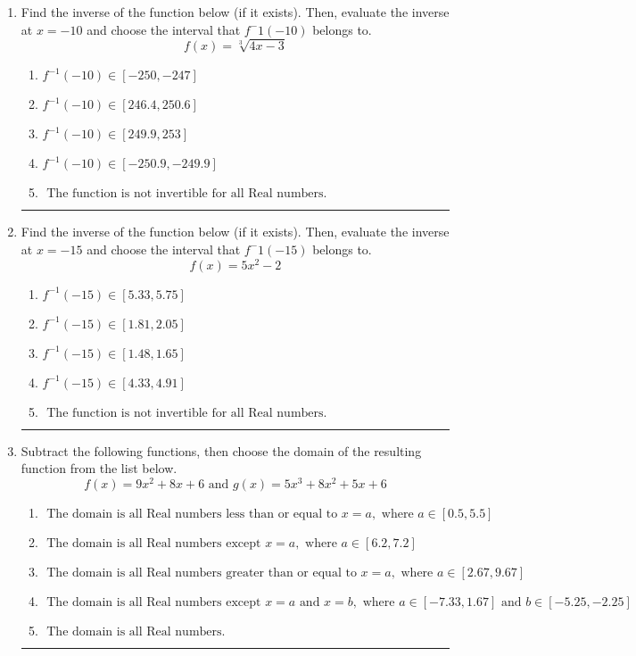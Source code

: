 \documentclass[14pt]{extbook}
\newcommand{\litem}[1]{\item#1\hspace*{-1cm}\rule{\textwidth}{0.4pt}}
\begin{document}
\begin{enumerate}
{\begin{enumerate}[label=\Alph*.]
\end{enumerate} }
\litem{
Find the inverse of the function below (if it exists). Then, evaluate the inverse at $x = -10$ and choose the interval that $f^-1(-10)$ belongs to.\[ f(x) = \sqrt[3]{4 x - 3} \]\begin{enumerate}[label=\Alph*.]
\item \( f^{-1}(-10) \in [-250, -247] \)
\item \( f^{-1}(-10) \in [246.4, 250.6] \)
\item \( f^{-1}(-10) \in [249.9, 253] \)
\item \( f^{-1}(-10) \in [-250.9, -249.9] \)
\item \( \text{ The function is not invertible for all Real numbers. } \)

\end{enumerate} }
\litem{
Find the inverse of the function below (if it exists). Then, evaluate the inverse at $x = -15$ and choose the interval that $f^-1(-15)$ belongs to.\[ f(x) = 5 x^2 - 2 \]\begin{enumerate}[label=\Alph*.]
\item \( f^{-1}(-15) \in [5.33, 5.75] \)
\item \( f^{-1}(-15) \in [1.81, 2.05] \)
\item \( f^{-1}(-15) \in [1.48, 1.65] \)
\item \( f^{-1}(-15) \in [4.33, 4.91] \)
\item \( \text{ The function is not invertible for all Real numbers. } \)

\end{enumerate} }
\litem{
Subtract the following functions, then choose the domain of the resulting function from the list below.\[ f(x) = 9x^{2} +8 x + 6 \text{ and } g(x) = 5x^{3} +8 x^{2} +5 x + 6 \]\begin{enumerate}[label=\Alph*.]
\item \( \text{ The domain is all Real numbers less than or equal to } x = a, \text{ where } a \in [0.5, 5.5] \)
\item \( \text{ The domain is all Real numbers except } x = a, \text{ where } a \in [6.2, 7.2] \)
\item \( \text{ The domain is all Real numbers greater than or equal to } x = a, \text{ where } a \in [2.67, 9.67] \)
\item \( \text{ The domain is all Real numbers except } x = a \text{ and } x = b, \text{ where } a \in [-7.33, 1.67] \text{ and } b \in [-5.25, -2.25] \)
\item \( \text{ The domain is all Real numbers. } \)

\end{enumerate} }
\end{enumerate}
\end{document}
